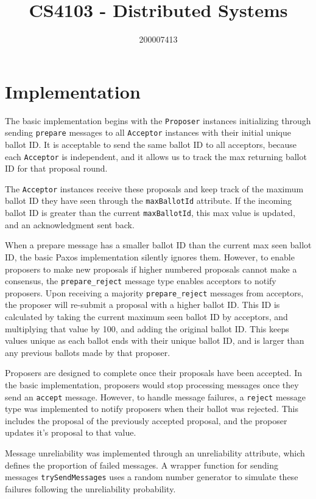 \documentclass[a4paper, 12pt]{article}
\title{CS4103 - Distributed Systems}
\author{200007413}
\date{}
\begin{document}
{\huge\thetitle}

{\Large\theauthor}

\section{Implementation}

The basic implementation begins with the \texttt{Proposer} instances initializing through sending \texttt{prepare} messages to all \texttt{Acceptor} instances with their initial unique ballot ID. It is acceptable to send the same ballot ID to all acceptors, because each \texttt{Acceptor} is independent, and it allows us to track the max returning ballot ID for that proposal round.

The \texttt{Acceptor} instances receive these proposals and keep track of the maximum ballot ID they have seen through the \texttt{maxBallotId} attribute. If the incoming ballot ID is greater than the current \texttt{maxBallotId}, this max value is updated, and an acknowledgment sent back.

When a prepare message has a smaller ballot ID than the current max seen ballot ID, the basic Paxos implementation silently ignores them. However, to enable proposers to make new proposals if higher numbered proposals cannot make a consensus, the \texttt{prepare\_reject} message type enables acceptors to notify proposers. Upon receiving a majority \texttt{prepare\_reject} messages from acceptors, the proposer will re-submit a proposal with a higher ballot ID. This ID is calculated by taking the current maximum seen ballot ID by acceptors, and multiplying that value by 100, and adding the original ballot ID. This keeps values unique as each ballot ends with their unique ballot ID, and is larger than any previous ballots made by that proposer.

Proposers are designed to complete once their proposals have been accepted. In the basic implementation, proposers would stop processing messages once they send an \texttt{accept} message. However, to handle message failures, a \texttt{reject} message type was implemented to notify proposers when their ballot was rejected. This includes the proposal of the previously accepted proposal, and the proposer updates it's proposal to that value.

Message unreliability was implemented through an unreliability attribute, which defines the proportion of failed messages. A wrapper function for sending messages \texttt{trySendMessages} uses a random number generator to simulate these failures following the unreliability probability.
\end{document}
